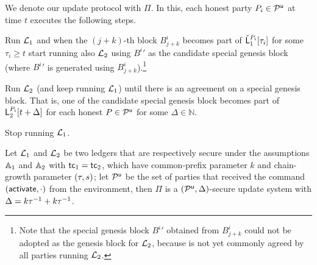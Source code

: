 
We denote our update protocol with $\Pi$. In this, each honest party $P_i\in\mathcal{P}^\mathsf{u}$ at time $t$ executes the following steps.

\begin{myenumerate}
	\item Run $\mathcal{L}_1$ and when the $(j+k)$-th block $B^i_{j+k}$ becomes part of $\check {\mathsf{L}}_1^{P_i}[\tau_i]$ for some $\tau_i \geq t$
	start running also $\mathcal{L}_2$ using ${B^i}'$ as the candidate special genesis block (where ${B^i}'$ is generated using $B^i_{j+k}$).\footnote{Note that
	the special genesis block ${B^i}'$ obtained from $B^i_{j+k}$ could not be adopted as the genesis block for $\mathcal{L}_2$, because is not yet commonly agreed by all parties running $\mathcal{L}_2$.}
	\item Run $\mathcal{L}_2$ (and keep running $\mathcal{L}_1$) until there is an agreement on a special genesis block. That is, one of the candidate special genesis block 
	becomes part of $\mathsf{L}_2^{P_i}[t+\Delta]$ for each honest $P\in\mathcal{P}^\mathsf{u}$ for some $\Delta\in\mathbb{N}$.
	\item Stop running $\mathcal{L}_1$.
\end{myenumerate}



\begin{theorem}\label{th:main}
Let $\mathcal{L}_1$ and $\mathcal{L}_2$ be two ledgers that are respectively secure under the assumptions $\mathbb{A}_1$ and $\mathbb{A}_2$ with $\mathsf{tc}_1=\mathsf{tc}_2$, which have common-prefix parameter $k$ and chain-growth parameter $(\tau, s)$; let $\mathcal{P}^\mathsf{u}$ be the set of parties that received the command $(\mathsf{activate},\cdot)$ from the environment, then
 $\Pi$ is a $(\mathcal{P}^\mathsf{u},\Delta)$-secure update system with $\Delta=k \tau^{-1} + k \tau^{-1}$.
\end{theorem}

